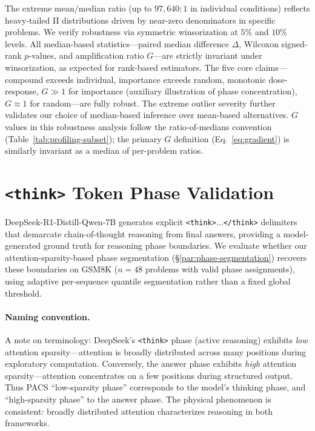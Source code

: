 The extreme mean/median ratio (up to $97{,}640{:}1$ in individual conditions) reflects heavy-tailed II distributions driven by near-zero denominators in specific problems. We verify robustness via symmetric winsorization at $5\%$ and $10\%$ levels. All median-based statistics---paired median difference $\Delta$, Wilcoxon signed-rank $p$-values, and amplification ratio $G$---are strictly invariant under winsorization, as expected for rank-based estimators. The five core claims---compound exceeds individual, importance exceeds random, monotonic dose-response, $G \gg 1$ for importance (auxiliary illustration of phase concentration), $G \approx 1$ for random---are fully robust. The extreme outlier severity further validates our choice of median-based inference over mean-based alternatives. $G$ values in this robustness analysis follow the ratio-of-medians convention (Table~\ref{tab:profiling-subset}); the primary $G$ definition (Eq.~\ref{eq:gradient}) is similarly invariant as a median of per-problem ratios.


\section{\texttt{<think>} Token Phase Validation}
\label{app:think-validation}

DeepSeek-R1-Distill-Qwen-7B generates explicit \texttt{<think>}...\texttt{</think>} delimiters that demarcate chain-of-thought reasoning from final answers, providing a model-generated ground truth for reasoning phase boundaries. We evaluate whether our attention-sparsity-based phase segmentation (\S\ref{par:phase-segmentation}) recovers these boundaries on GSM8K ($n{=}48$ problems with valid phase assignments), using adaptive per-sequence quantile segmentation rather than a fixed global threshold.

\paragraph{Naming convention.}
A note on terminology: DeepSeek's \texttt{<think>} phase (active reasoning) exhibits \emph{low} attention sparsity---attention is broadly distributed across many positions during exploratory computation. Conversely, the answer phase exhibits \emph{high} attention sparsity---attention concentrates on a few positions during structured output. Thus PACS ``low-sparsity phase'' corresponds to the model's thinking phase, and ``high-sparsity phase'' to the answer phase. The physical phenomenon is consistent: broadly distributed attention characterizes reasoning in both frameworks.

